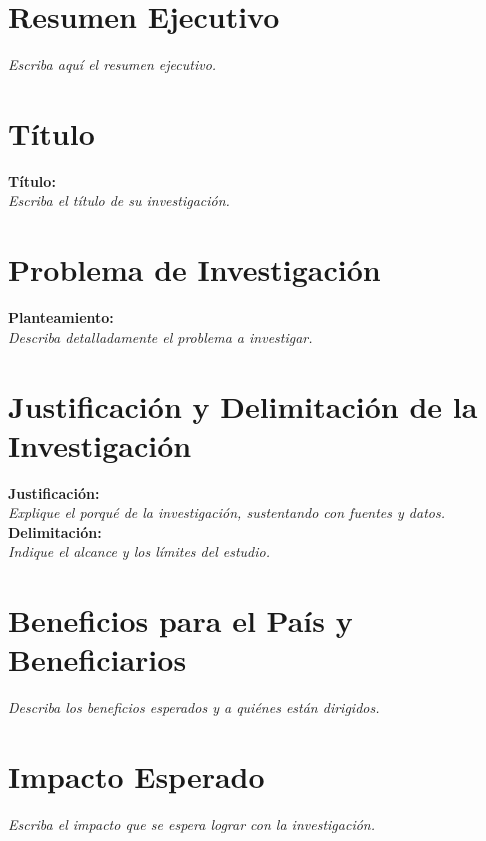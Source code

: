 \documentclass[12pt,a4paper]{article}
\begin{document}
\section*{Resumen Ejecutivo}
\noindent
\textit{Escriba aquí el resumen ejecutivo.}

\section{Título}
\noindent
\textbf{Título:} \\
\textit{Escriba el título de su investigación.}

\section{Problema de Investigación}
\noindent
\textbf{Planteamiento:} \\
\textit{Describa detalladamente el problema a investigar.}

\section{Justificación y Delimitación de la Investigación}
\noindent
\textbf{Justificación:} \\
\textit{Explique el porqué de la investigación, sustentando con fuentes y datos.} \\[1ex]
\textbf{Delimitación:} \\
\textit{Indique el alcance y los límites del estudio.}

\section{Beneficios para el País y Beneficiarios}
\noindent
\textit{Describa los beneficios esperados y a quiénes están dirigidos.}

\section{Impacto Esperado}
\noindent
\textit{Escriba el impacto que se espera lograr con la investigación.}
\end{document}
